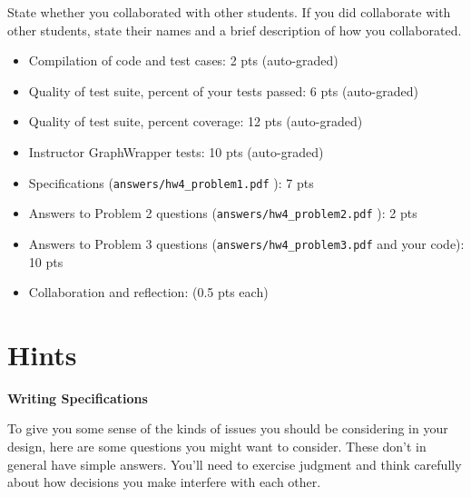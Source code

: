 \documentclass[11pt]{article}
\begin{document}
\noindent State whether you collaborated with other students. If you did collaborate with other students, state their names and a brief description of how you collaborated.

\begin{itemize}
\item Compilation of code and test cases: 2 pts (auto-graded)
\item
Quality of test suite, percent of your tests passed: 6 pts (auto-graded)
\item
Quality of test suite, percent coverage: 12 pts (auto-graded)
\item
Instructor GraphWrapper tests: 10 pts (auto-graded)
\item
Specifications (\texttt{answers/hw4\_problem1.pdf} ): 7 pts
\item
Answers to Problem 2 questions (\texttt{answers/hw4\_problem2.pdf} ): 2 pts
\item
Answers to Problem 3 questions (\texttt{answers/hw4\_problem3.pdf} and your code): 10 pts
\item
Collaboration and reflection: (0.5 pts each)
\end{itemize}
\newpage

\section*{Hints}
\label{sec:Hints}
\large{\textbf{Writing Specifications}}

\noindent To give you some sense of the kinds of issues you should be considering in your design, here are some questions you might want to consider. These don't in general have simple answers. You'll need to exercise judgment and think carefully about how decisions you make interfere with each other.
\end{document}
